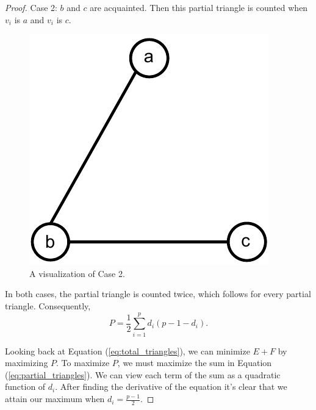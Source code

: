 \documentclass[10pt]{amsart}
\begin{document}
\begin{proof}
    \noindent Case 2: $b$ and $c$ are acquainted.
    Then this partial triangle is counted when $v_i$ is $a$ and $v_i$ is $c$.

    \begin{figure}[h!]
        \centering
        \includegraphics[scale=.6]{../figures/partial_case_2.pdf}
        \caption{A visualization of Case 2.}
    \end{figure}
    In both cases, the partial triangle is counted twice, which follows for every partial triangle.
    Consequently,
    \begin{equation}
        P = \frac{1}{2} \sum^{p}_{i=1}{d_i(p - 1 - d_i)} \label{eq:partial_triangles}.
    \end{equation}

    Looking back at Equation (\ref{eq:total_triangles}), we can minimize $E + F$ by maximizing $P$.
    To maximize $P$, we must maximize the sum in Equation (\ref{eq:partial_triangles}). We can view 
    each term of the sum as a quadratic function of $d_i$. After finding the derivative of the 
    equation it's clear that we attain our maximum when $d_i = \frac{p - 1}{2}$. 
    

\end{proof}
\end{document}
